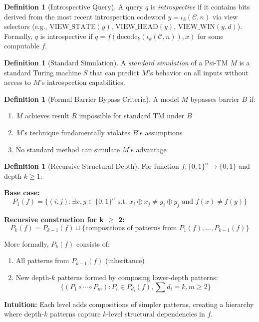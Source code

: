 \documentclass[11pt]{article}
\theoremstyle{plain}
\theoremstyle{definition}
\newtheorem{definition}[theorem]{Definition}
\begin{document}
\begin{definition}[Introspective Query]
A query $q$ is \textit{introspective} if it contains bits derived from the most recent introspection codeword $y=\iota_k(\mathcal{C},n)$ via view selectors (e.g., $\mathrm{VIEW\_STATE}(y)$, $\mathrm{VIEW\_HEAD}(y)$, $\mathrm{VIEW\_WIN}(y,d)$). Formally, $q$ is introspective if $q = f(\mathrm{decode}_k(\iota_k(\mathcal{C}, n)), x)$ for some computable $f$.
\end{definition}

\begin{definition}[Standard Simulation]
A \textit{standard simulation} of a Psi-TM $M$ is a standard Turing machine $S$ that can predict $M$'s behavior on all inputs without access to $M$'s introspection capabilities.
\end{definition}

\begin{definition}[Formal Barrier Bypass Criteria]
A model $M$ bypasses barrier $B$ if:
\begin{enumerate}
\item $M$ achieves result $R$ impossible for standard TM under $B$
\item $M$'s technique fundamentally violates $B$'s assumptions
\item No standard method can simulate $M$'s advantage
\end{enumerate}
\end{definition}

\begin{definition}[Recursive Structural Depth]
For function $f: \{0,1\}^n \to \{0,1\}$ and depth $k \geq 1$:

\textbf{Base case:}
$$P_1(f) = \{(i,j) : \exists x,y \in \{0,1\}^n \text{ s.t. } x_i \oplus x_j \neq y_i \oplus y_j \text{ and } f(x) \neq f(y)\}$$

\textbf{Recursive construction for k \ensuremath{\geq} 2:}
$$P_k(f) = P_{k-1}(f) \cup \{\text{compositions of patterns from } P_1(f), \ldots, P_{k-1}(f)\}$$

More formally, $P_k(f)$ consists of:
\begin{enumerate}
\item All patterns from $P_{k-1}(f)$ (inheritance)
\item New depth-$k$ patterns formed by composing lower-depth patterns:
   $$\{(P_1 \circ \cdots \circ P_m) : P_i \in P_{d_i}(f), \sum d_i = k, m \geq 2\}$$
\end{enumerate}

\textbf{Intuition:} Each level adds compositions of simpler patterns, creating a hierarchy where depth-$k$ patterns capture $k$-level structural dependencies in $f$.
\end{definition}
\end{document}
